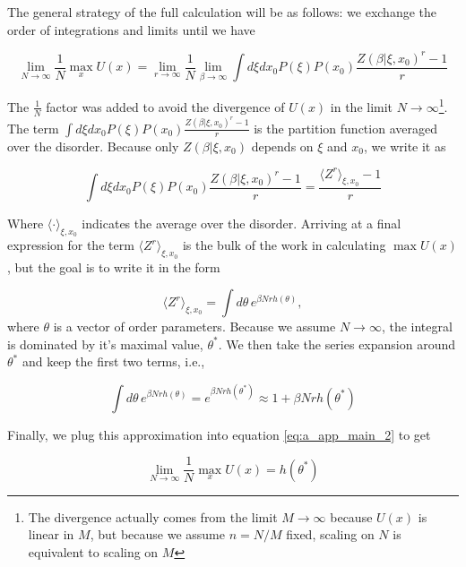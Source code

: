 The general strategy of the full calculation will be as follows: we
exchange the order of integrations and limits until we have

\begin{equation}
    \label{eq:a_app_main_2}
    \lim_{N\to\infty} \frac{1}{N}\max_x U(x) =
    \lim_{r\to\infty} \frac{1}{N}\lim_{\beta\to\infty} \int d\xi dx_0 P(\xi) P(x_0)
    \frac{Z(\beta | \xi, x_0)^r - 1}{r}
\end{equation}
 
The $\frac{1}{N}$ factor was added to avoid the divergence of $U(x)$
in the limit $N\to\infty$\footnote{The divergence actually comes from
  the limit $M\to\infty$ because $U(x)$ is linear in $M$, but because
  we assume $n = N/M$ fixed, scaling on $N$ is equivalent to scaling
  on $M$}. The term $\int d\xi dx_0 P(\xi) P(x_0)
\frac{Z(\beta | \xi, x_0)^r - 1}{r}$ is the partition function
averaged over the disorder. Because only $Z(\beta | \xi, x_0)$
depends on $\xi$ and $x_0$, we write it as

    \begin{equation}
      \label{eq:a_2}
      \int d\xi dx_0 P(\xi) P(x_0) \frac{Z(\beta | \xi, x_0)^r - 1}{r}
      = \frac{\langle Z^r \rangle_{\xi, x_0} - 1}{r}
    \end{equation}

Where $\langle \cdot \rangle_{\xi, x_0}$ indicates the average
over the disorder. Arriving at a final expression for the term
$\langle Z^r \rangle_{\xi, x_0}$ is the bulk of the work in
calculating $\max U(x)$, but the goal is to write it in the form

\begin{equation}
  \label{eq:a_3}
  \langle Z^r \rangle_{\xi, x_0} = \int d\theta \, e^{\beta N r h(\theta)},
\end{equation}
where $\theta$ is a vector of order parameters. Because we assume
$N\to \infty$, the integral is dominated by it's maximal value, $\theta^\ast$. We
then take the series expansion around $\theta^\ast$ and keep the first
two terms, i.e.,

\begin{equation}
  \label{eq:a_4}
  \int d\theta  \, e^{\beta N r h(\theta)}  =  e^{\beta N r
    h(\theta^\ast)} \approx 1 + \beta N r h(\theta^\ast)
\end{equation}

Finally, we plug this approximation into equation \eqref{eq:a_app_main_2}
to get

\begin{equation}
    \label{eq:a_app_main_3}
    \lim_{N\to\infty} \frac{1}{N}\max_x U(x) =
    h(\theta^\ast)
\end{equation}

